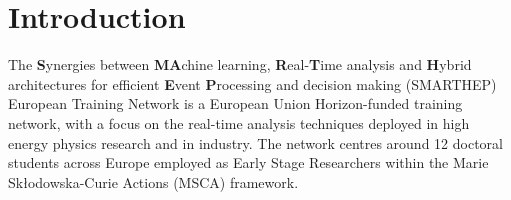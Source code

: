 \section{Introduction}
\label{intro}
The \textbf{S}ynergies between \textbf{MA}chine learning, \textbf{R}eal-\textbf{T}ime analysis and \textbf{H}ybrid architectures for efficient \textbf{E}vent \textbf{P}rocessing and decision making (SMARTHEP) European Training Network is a European Union Horizon-funded training network, with a focus on the real-time analysis techniques deployed in high energy physics research and in industry. The network centres around 12 doctoral students across Europe employed as Early Stage Researchers within the Marie Sk{\l}odowska-Curie Actions (MSCA) framework.